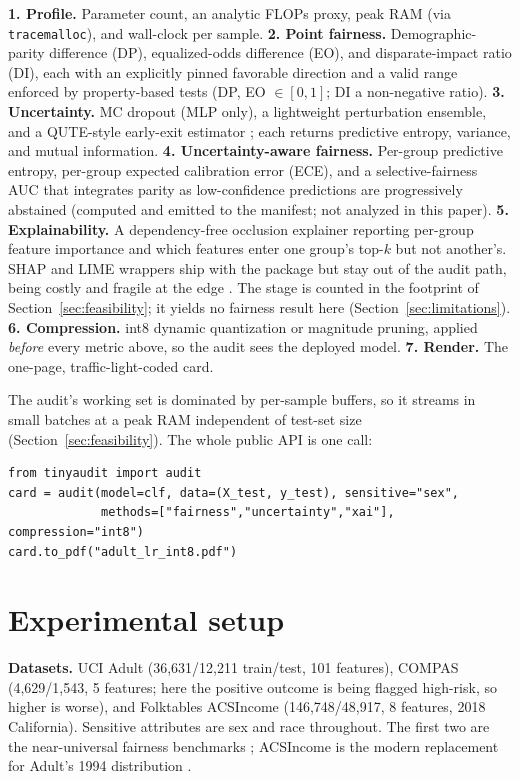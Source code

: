 \documentclass{article}
\begin{document}
\textbf{1. Profile.} Parameter count, an analytic FLOPs proxy, peak RAM (via \texttt{tracemalloc}), and wall-clock per sample.
\textbf{2. Point fairness.} Demographic-parity difference (DP), equalized-odds difference (EO), and disparate-impact ratio (DI), each with an explicitly pinned favorable direction and a valid range enforced by property-based tests (DP, EO $\in [0,1]$; DI a non-negative ratio).
\textbf{3. Uncertainty.} MC dropout (MLP only), a lightweight perturbation ensemble, and a QUTE-style early-exit estimator \cite{ghanathe2025}; each returns predictive entropy, variance, and mutual information.
\textbf{4. Uncertainty-aware fairness.} Per-group predictive entropy, per-group expected calibration error (ECE), and a selective-fairness AUC that integrates parity as low-confidence predictions are progressively abstained (computed and emitted to the manifest; not analyzed in this paper).
\textbf{5. Explainability.} A dependency-free occlusion explainer reporting per-group feature importance and which features enter one group's top-$k$ but not another's. SHAP and LIME wrappers ship with the package but stay out of the audit path, being costly and fragile at the edge \cite{salih2025,nguyen2024}. The stage is counted in the footprint of Section~\ref{sec:feasibility}; it yields no fairness result here (Section~\ref{sec:limitations}).
\textbf{6. Compression.} int8 dynamic quantization or magnitude pruning, applied \emph{before} every metric above, so the audit sees the deployed model.
\textbf{7. Render.} The one-page, traffic-light-coded card.

The audit's working set is dominated by per-sample buffers, so it streams in small batches at a peak RAM independent of test-set size (Section~\ref{sec:feasibility}). The whole public API is one call:

\begin{verbatim}
from tinyaudit import audit
card = audit(model=clf, data=(X_test, y_test), sensitive="sex",
             methods=["fairness","uncertainty","xai"], compression="int8")
card.to_pdf("adult_lr_int8.pdf")
\end{verbatim}

\section{Experimental setup}

\textbf{Datasets.} UCI Adult \cite{kohavi1996} (36{,}631/12{,}211 train/test, 101 features), COMPAS \cite{angwin2016} (4{,}629/1{,}543, 5 features; here the positive outcome is being flagged high-risk, so higher is worse), and Folktables ACSIncome \cite{ding2021} (146{,}748/48{,}917, 8 features, 2018 California). Sensitive attributes are sex and race throughout. The first two are the near-universal fairness benchmarks \cite{fabris2022}; ACSIncome is the modern replacement for Adult's 1994 distribution \cite{ding2021}.
\end{document}
